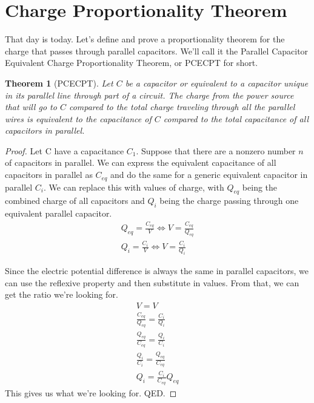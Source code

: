 \documentclass[12pt]{article}
\newtheorem{theorem}{Theorem}
\begin{document}
\section*{Charge Proportionality Theorem}
That day is today. Let's define and prove a proportionality theorem for the charge that passes through parallel capacitors.
We'll call it the Parallel Capacitor Equivalent Charge Proportionality Theorem, or PCECPT for short.
\begin{theorem}[PCECPT]
    Let $C$ be a capacitor or equivalent to a capacitor unique in its parallel line through part of a circuit.
    The charge from the power source that will go to $C$ compared to the total charge traveling through all the parallel wires is equivalent to the capacitance of $C$ compared to the total capacitance of all capacitors in parallel.
\end{theorem}
\begin{proof}
    Let C have a capacitance $C_1$.
    Suppose that there are a nonzero number $n$ of capacitors in parallel. 
    We can express the equivalent capacitance of all capacitors in parallel as $C_{eq}$ and do the same for a generic equivalent capacitor in parallel $C_i$.
    We can replace this with values of charge, with $Q_{eq}$ being the combined charge of all capacitors and $Q_i$ being the charge passing through one equivalent parallel capacitor.
    \begin{gather*}
        Q_{eq} = \frac{C_{eq}}{V}   \Leftrightarrow V = \frac{C_{eq}}{Q_{eq}}\\
        Q_i =   \frac{C_i}{V}       \Leftrightarrow V = \frac{C_i}{Q_i}
    \end{gather*}

    Since the electric potential difference is always the same in parallel capacitors, we can use the reflexive property and then substitute in values.
    From that, we can get the ratio we're looking for.
    \begin{gather*}
        V   =   V\\
        \frac{C_{eq}}{Q_{eq}}   =   \frac{C_i}{Q_i}\\
        \frac{Q_{eq}}{C_{eq}}   =   \frac{Q_i}{C_i}\\
        \frac{Q_i}{C_i}         =   \frac{Q_{eq}}{C_{eq}}\\
        Q_i =   \frac{C_i}{C_{eq}}Q_{eq}
    \end{gather*}
    This gives us what we're looking for. QED.
\end{proof}
\end{document}
